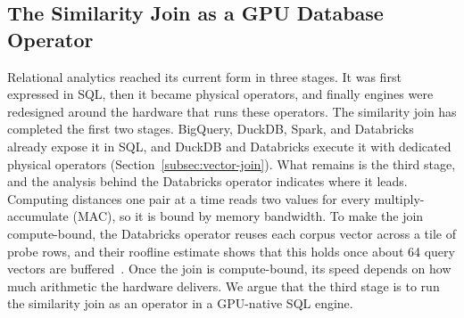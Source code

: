 \subsection{The Similarity Join as a GPU Database Operator}\label{subsec:why-gpu-database}

Relational analytics reached its current form in three stages.
It was first expressed in SQL, then it became physical operators, and finally engines were redesigned around the hardware that runs these operators.
The similarity join has completed the first two stages.
BigQuery, DuckDB, Spark, and Databricks already expose it in SQL, and DuckDB and Databricks execute it with dedicated physical operators (Section~\ref{subsec:vector-join}).
What remains is the third stage, and the analysis behind the Databricks operator indicates where it leads.
Computing distances one pair at a time reads two values for every multiply-accumulate (MAC), so it is bound by memory bandwidth. 
To make the join compute-bound, the Databricks operator reuses each corpus vector across a tile of probe rows, and their roofline estimate shows that this holds once about 64 query vectors are buffered~\cite{DatabricksNearestByJoinBlog26}.
Once the join is compute-bound, its speed depends on how much arithmetic the hardware delivers.
We argue that the third stage is to run the similarity join as an operator in a GPU-native SQL engine.

